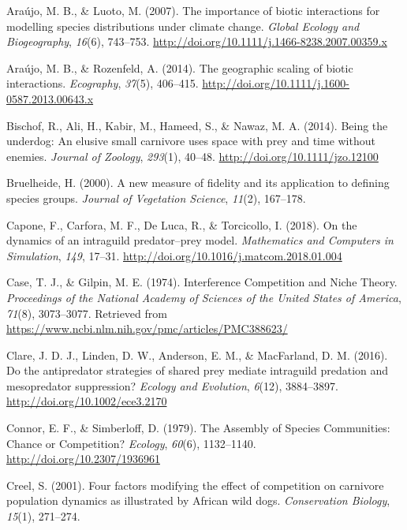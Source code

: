 \documentclass[12pt,twoside]{reedthesis}
\begin{document}
\leavevmode\hypertarget{ref-araujo_importance_2007}{}%
Araújo, M. B., \& Luoto, M. (2007). The importance of biotic interactions for modelling species distributions under climate change. \emph{Global Ecology and Biogeography}, \emph{16}(6), 743--753. \url{http://doi.org/10.1111/j.1466-8238.2007.00359.x}

\leavevmode\hypertarget{ref-araujo_geographic_2014}{}%
Araújo, M. B., \& Rozenfeld, A. (2014). The geographic scaling of biotic interactions. \emph{Ecography}, \emph{37}(5), 406--415. \url{http://doi.org/10.1111/j.1600-0587.2013.00643.x}

\leavevmode\hypertarget{ref-bischof_being_2014}{}%
Bischof, R., Ali, H., Kabir, M., Hameed, S., \& Nawaz, M. A. (2014). Being the underdog: An elusive small carnivore uses space with prey and time without enemies. \emph{Journal of Zoology}, \emph{293}(1), 40--48. \url{http://doi.org/10.1111/jzo.12100}

\leavevmode\hypertarget{ref-bruelheide_new_2000}{}%
Bruelheide, H. (2000). A new measure of fidelity and its application to defining species groups. \emph{Journal of Vegetation Science}, \emph{11}(2), 167--178.

\leavevmode\hypertarget{ref-capone_dynamics_2018}{}%
Capone, F., Carfora, M. F., De Luca, R., \& Torcicollo, I. (2018). On the dynamics of an intraguild predator--prey model. \emph{Mathematics and Computers in Simulation}, \emph{149}, 17--31. \url{http://doi.org/10.1016/j.matcom.2018.01.004}

\leavevmode\hypertarget{ref-case_interference_1974}{}%
Case, T. J., \& Gilpin, M. E. (1974). Interference Competition and Niche Theory. \emph{Proceedings of the National Academy of Sciences of the United States of America}, \emph{71}(8), 3073--3077. Retrieved from \url{https://www.ncbi.nlm.nih.gov/pmc/articles/PMC388623/}

\leavevmode\hypertarget{ref-clare_antipredator_2016}{}%
Clare, J. D. J., Linden, D. W., Anderson, E. M., \& MacFarland, D. M. (2016). Do the antipredator strategies of shared prey mediate intraguild predation and mesopredator suppression? \emph{Ecology and Evolution}, \emph{6}(12), 3884--3897. \url{http://doi.org/10.1002/ece3.2170}

\leavevmode\hypertarget{ref-connor_assembly_1979}{}%
Connor, E. F., \& Simberloff, D. (1979). The Assembly of Species Communities: Chance or Competition? \emph{Ecology}, \emph{60}(6), 1132--1140. \url{http://doi.org/10.2307/1936961}

\leavevmode\hypertarget{ref-creel_four_2001}{}%
Creel, S. (2001). Four factors modifying the effect of competition on carnivore population dynamics as illustrated by African wild dogs. \emph{Conservation Biology}, \emph{15}(1), 271--274.
\end{document}
